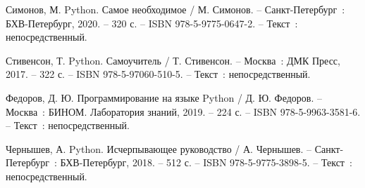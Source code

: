 \begin{thebibliography}{9}
	 Симонов, М. Python. Самое необходимое / М. Симонов. – Санкт-Петербург~: БХВ-Петербург, 2020. – 320 с. – ISBN 978-5-9775-0647-2. – Текст~: непосредственный.
	
	 Стивенсон, Т. Python. Самоучитель / Т. Стивенсон. – Москва~: ДМК Пресс, 2017. – 322 с. – ISBN 978-5-97060-510-5. – Текст~: непосредственный.
	
	 Федоров, Д. Ю. Программирование на языке Python / Д. Ю. Федоров. – Москва~: БИНОМ. Лаборатория знаний, 2019. – 224 с. – ISBN 978-5-9963-3581-6. – Текст~: непосредственный.
	
	 Чернышев, А. Python. Исчерпывающее руководство / А. Чернышев. – Санкт-Петербург~: БХВ-Петербург, 2018. – 512 с. – ISBN 978-5-9775-3898-5. – Текст~: непосредственный.
	
\end{thebibliography}